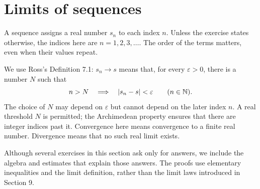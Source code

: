 \section{Limits of sequences}
\label{sec:limits-of-sequences}
A sequence assigns a real number $s_n$ to each index $n$. Unless the
exercise states otherwise, the indices here are $n=1,2,3,\ldots$.
The order of the terms matters, even when their values repeat.

We use Ross's Definition 7.1: $s_n\to s$ means that, for every
$\varepsilon>0$, there is a number $N$ such that
\[
 n>N\quad\Longrightarrow\quad \left|s_n-s\right|<\varepsilon
 \qquad(n\in\mathbb{N}).
\]
The choice of $N$ may depend on $\varepsilon$ but cannot depend on
the later index $n$. A real threshold $N$ is permitted; the
Archimedean property ensures that there are integer indices past it.
Convergence here means convergence to a finite real number.
Divergence means that no such real limit exists.

Although several exercises in this section ask only for answers,
we include the algebra and estimates that explain those answers.
The proofs use elementary inequalities and the limit definition,
rather than the limit laws introduced in Section 9.




